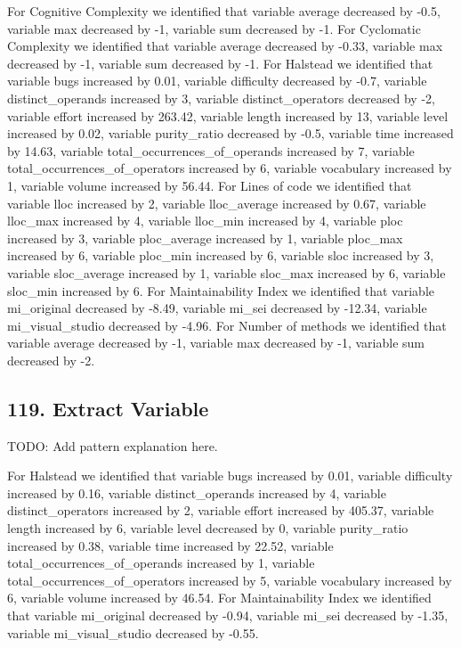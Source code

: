 For Cognitive Complexity we identified that variable average decreased by -0.5, variable max decreased by -1, variable sum decreased by -1.
For Cyclomatic Complexity we identified that variable average decreased by -0.33, variable max decreased by -1, variable sum decreased by -1.
For Halstead we identified that variable bugs increased by 0.01, variable difficulty decreased by -0.7, variable distinct\_operands increased by 3, variable distinct\_operators decreased by -2, variable effort increased by 263.42, variable length increased by 13, variable level increased by 0.02, variable purity\_ratio decreased by -0.5, variable time increased by 14.63, variable total\_occurrences\_of\_operands increased by 7, variable total\_occurrences\_of\_operators increased by 6, variable vocabulary increased by 1, variable volume increased by 56.44.
For Lines of code we identified that variable lloc increased by 2, variable lloc\_average increased by 0.67, variable lloc\_max increased by 4, variable lloc\_min increased by 4, variable ploc increased by 3, variable ploc\_average increased by 1, variable ploc\_max increased by 6, variable ploc\_min increased by 6, variable sloc increased by 3, variable sloc\_average increased by 1, variable sloc\_max increased by 6, variable sloc\_min increased by 6.
For Maintainability Index we identified that variable mi\_original decreased by -8.49, variable mi\_sei decreased by -12.34, variable mi\_visual\_studio decreased by -4.96.
For Number of methods we identified that variable average decreased by -1, variable max decreased by -1, variable sum decreased by -2.

\subsection{119. Extract Variable}

TODO: Add pattern explanation here.

For Halstead we identified that variable bugs increased by 0.01, variable difficulty increased by 0.16, variable distinct\_operands increased by 4, variable distinct\_operators increased by 2, variable effort increased by 405.37, variable length increased by 6, variable level decreased by 0, variable purity\_ratio increased by 0.38, variable time increased by 22.52, variable total\_occurrences\_of\_operands increased by 1, variable total\_occurrences\_of\_operators increased by 5, variable vocabulary increased by 6, variable volume increased by 46.54.
For Maintainability Index we identified that variable mi\_original decreased by -0.94, variable mi\_sei decreased by -1.35, variable mi\_visual\_studio decreased by -0.55.

